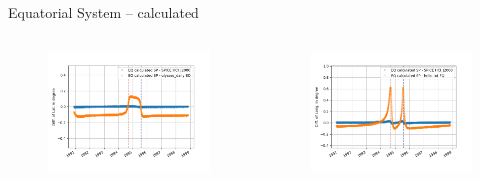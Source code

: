 \documentclass{beamer}
\begin{document}
\begin{frame}{Equatorial System -- calculated}

\begin{columns}
	\hspace{-1cm}
	\begin{figure}									
		\includegraphics[width=1.25\textwidth]{Pics/EQ_LAT_CALC.png}
	\end{figure}
	\begin{figure}									
		\includegraphics[width=1.25\textwidth]{Pics/EQ_LONG_CALC.png}
	\end{figure}
\end{columns}
\end{frame}
\end{document}
